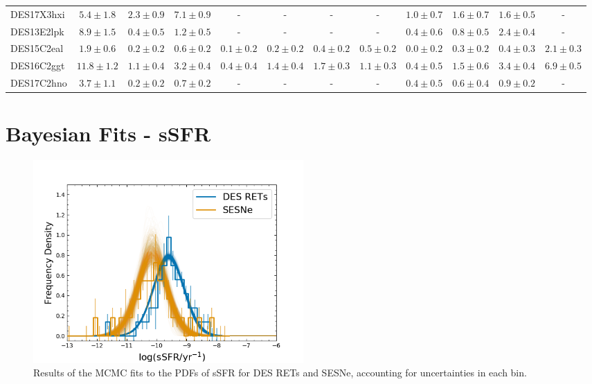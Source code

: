 \documentclass[fleqn,usenatbib,]{mnras}
\begin{document}
\begin{table}
\begin{tabular}{lccccccccccc}
DES17X3hxi  &    $5.4 \pm 1.8$ &  $2.3 \pm 0.9$ &   $7.1 \pm 0.9$ &              - &               - &              - &              - &  $1.0 \pm 0.7$ &   $1.6 \pm 0.7$ &   $1.6 \pm 0.5$ &               - \\
DES13E2lpk  &    $8.9 \pm 1.5$ &  $0.4 \pm 0.5$ &   $1.2 \pm 0.5$ &              - &               - &              - &              - &  $0.4 \pm 0.6$ &   $0.8 \pm 0.5$ &   $2.4 \pm 0.4$ &               - \\
DES15C2eal  &    $1.9 \pm 0.6$ &  $0.2 \pm 0.2$ &   $0.6 \pm 0.2$ &  $0.1 \pm 0.2$ &   $0.2 \pm 0.2$ &  $0.4 \pm 0.2$ &  $0.5 \pm 0.2$ &  $0.0 \pm 0.2$ &   $0.3 \pm 0.2$ &   $0.4 \pm 0.3$ &   $2.1 \pm 0.3$ \\
DES16C2ggt  &   $11.8 \pm 1.2$ &  $1.1 \pm 0.4$ &   $3.2 \pm 0.4$ &  $0.4 \pm 0.4$ &   $1.4 \pm 0.4$ &  $1.7 \pm 0.3$ &  $1.1 \pm 0.3$ &  $0.4 \pm 0.5$ &   $1.5 \pm 0.6$ &   $3.4 \pm 0.4$ &   $6.9 \pm 0.5$ \\
DES17C2hno  &    $3.7 \pm 1.1$ &  $0.2 \pm 0.2$ &   $0.7 \pm 0.2$ &              - &               - &              - &              - &  $0.4 \pm 0.5$ &   $0.6 \pm 0.4$ &   $0.9 \pm 0.2$ &               - \\
\bottomrule
\end{tabular}
\end{table}

\newpage
\section{Bayesian Fits - sSFR}
\label{app:b}

\begin{figure}
\includegraphics[width=0.5\textwidth]{mc_figs/rets_s12_histfit_ssfr_final.png}
\caption{Results of the MCMC fits to the PDFs of sSFR for DES RETs and SESNe, accounting for uncertainties in each bin.
\label{fig:histfit_s12_ssfr}}
\end{figure}
\end{document}
